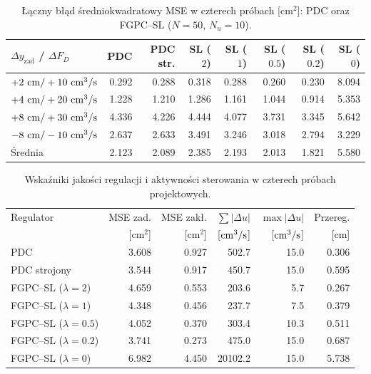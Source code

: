 \begin{table}[H]
\centering
\caption{Łączny błąd średniokwadratowy MSE w czterech próbach [$\mathrm{cm^2}$]: PDC oraz FGPC--SL ($N=50$, $N_u=10$).}
\footnotesize
\begin{tabular}{lrrrrrrr}\toprule
$\Delta y_{\mathrm{zad}}$ / $\Delta F_D$ & PDC & PDC str. & SL ($2$) & SL ($1$) & SL ($\num{0.5}$) & SL ($\num{0.2}$) & SL ($0$)\\\midrule
$+2\ \mathrm{cm}/+10\ \jednprzep$ & \num{0.292} & \num{0.288} & \num{0.318} & \num{0.288} & \num{0.260} & \num{0.230} & \num{8.094}\\
$+4\ \mathrm{cm}/+20\ \jednprzep$ & \num{1.228} & \num{1.210} & \num{1.286} & \num{1.161} & \num{1.044} & \num{0.914} & \num{5.353}\\
$+8\ \mathrm{cm}/+30\ \jednprzep$ & \num{4.336} & \num{4.226} & \num{4.444} & \num{4.077} & \num{3.731} & \num{3.345} & \num{5.642}\\
$-8\ \mathrm{cm}/-10\ \jednprzep$ & \num{2.637} & \num{2.633} & \num{3.491} & \num{3.246} & \num{3.018} & \num{2.794} & \num{3.229}\\\midrule
Średnia & \num{2.123} & \num{2.089} & \num{2.385} & \num{2.193} & \num{2.013} & \num{1.821} & \num{5.580}\\\bottomrule
\end{tabular}
\label{tab:sl-control}
\end{table}

\begin{table}[H]
\centering
\caption{Wskaźniki jakości regulacji i aktywności sterowania w czterech próbach projektowych.}
\small
\begin{tabular}{lrrrrr}\toprule
Regulator & MSE zad. & MSE zakł. & $\sum|\Delta u|$ & $\max|\Delta u|$ & Przereg.\\
 & [$\mathrm{cm^2}$] & [$\mathrm{cm^2}$] & [$\mathrm{cm^3/s}$] & [$\mathrm{cm^3/s}$] & [cm]\\\midrule
PDC                       & \num{3.608} & \num{0.927} & \num{502.7} & \num{15.0} & \num{0.306}\\
PDC strojony              & \num{3.544} & \num{0.917} & \num{450.7} & \num{15.0} & \num{0.595}\\
FGPC--SL ($\lambda=2$)    & \num{4.659} & \num{0.553} & \num{203.6} &  \num{5.7} & \num{0.267}\\
FGPC--SL ($\lambda=1$)    & \num{4.348} & \num{0.456} & \num{237.7} &  \num{7.5} & \num{0.379}\\
FGPC--SL ($\lambda=\num{0.5}$)& \num{4.052} & \num{0.370} & \num{303.4} & \num{10.3} & \num{0.511}\\
FGPC--SL ($\lambda=\num{0.2}$)& \num{3.741} & \num{0.273} & \num{475.0} & \num{15.0} & \num{0.687}\\
FGPC--SL ($\lambda=0$)    & \num{6.982} & \num{4.450} & \num{20102.2} & \num{15.0} & \num{5.738}\\\bottomrule
\end{tabular}
\label{tab:sl-metrics}
\end{table}

